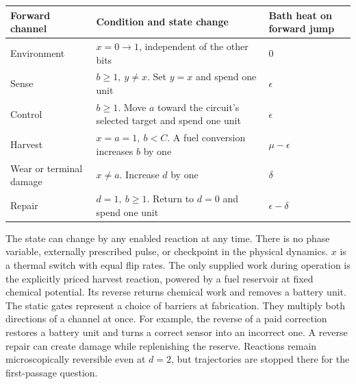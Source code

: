 \documentclass[
  11pt,
]{article}
\newcounter{none} %
\begin{document}
{\def\LTcaptype{none} %
\begin{longtable}[]{@{}
  >{\raggedright\arraybackslash}p{}
  >{\raggedright\arraybackslash}p{}
  >{\raggedleft\arraybackslash}p{}@{}}
\toprule\noalign{}
\begin{minipage}[b]{\linewidth}\raggedright
Forward channel
\end{minipage} & \begin{minipage}[b]{\linewidth}\raggedright
Condition and state change
\end{minipage} & \begin{minipage}[b]{\linewidth}\raggedleft
Bath heat on forward jump
\end{minipage} \\
\midrule\noalign{}
\endhead
\bottomrule\noalign{}
\endlastfoot
Environment & \(x=0\to1\), independent of the other bits & \(0\) \\
Sense & \(b\ge1,\ y\ne x\). Set \(y=x\) and spend one unit &
\(\epsilon\) \\
Control & \(b\ge1\). Move \(a\) toward the circuit's selected target and
spend one unit & \(\epsilon\) \\
Harvest & \(x=a=1,\ b<C\). A fuel conversion increases \(b\) by one &
\(\mu-\epsilon\) \\
Wear or terminal damage & \(x\ne a\). Increase \(d\) by one &
\(\delta\) \\
Repair & \(d=1,\ b\ge1\). Return to \(d=0\) and spend one unit &
\(\epsilon-\delta\) \\
\end{longtable}
}

The state can change by any enabled reaction at any time. There is no
phase variable, externally prescribed pulse, or checkpoint in the
physical dynamics. \(x\) is a thermal switch with equal flip rates. The
only supplied work during operation is the explicitly priced harvest
reaction, powered by a fuel reservoir at fixed chemical potential. Its
reverse returns chemical work and removes a battery unit. The static
gates represent a choice of barriers at fabrication. They multiply both
directions of a channel at once. For example, the reverse of a paid
correction restores a battery unit and turns a correct sensor into an
incorrect one. A reverse repair can create damage while replenishing the
reserve. Reactions remain microscopically reversible even at \(d=2\),
but trajectories are stopped there for the first-passage question.
\end{document}
